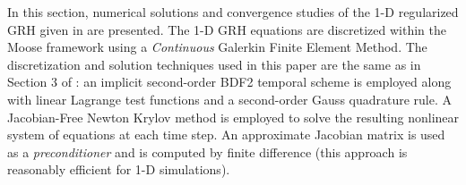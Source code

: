 \documentclass[times,doublespace]{fldauth}%
\begin{document}


In this section, numerical solutions and convergence studies of the 1-D regularized GRH given in  are presented.
The 1-D GRH equations are discretized within the Moose framework \cite{Moose} using a \emph{Continuous} Galerkin Finite Element Method.
The discretization and solution techniques used in this paper are the same as in Section 3 of \cite{our_jcp_radhy_paper}: an implicit second-order BDF2 temporal scheme is employed \cite{bdf2} along with linear Lagrange test functions and a second-order Gauss quadrature rule.
A Jacobian-Free Newton Krylov method \cite{JFNK} is employed to solve the resulting nonlinear system of equations at each time step.
An approximate Jacobian matrix is used as a \emph{preconditioner} and is computed by finite difference (this approach is reasonably efficient for 1-D simulations). 
\end{document}
